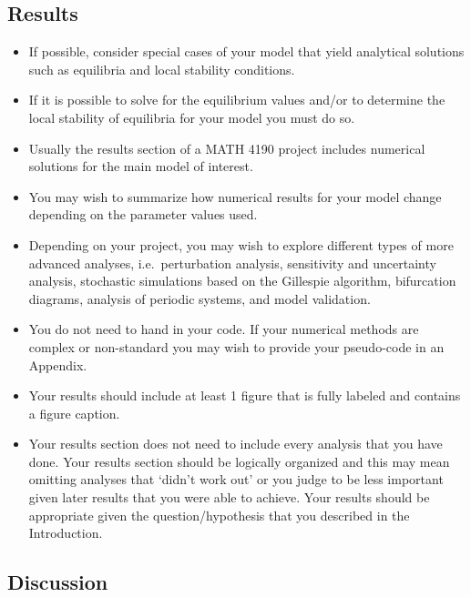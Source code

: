 \documentclass[]{book}
\providecommand{\tightlist}{%
  \setlength{\itemsep}{0pt}\setlength{\parskip}{0pt}}
\begin{document}
\subsection{Results}\label{results}

\begin{itemize}
\tightlist
\item
  If possible, consider special cases of your model that yield
  analytical solutions such as equilibria and local stability
  conditions.
\item
  If it is possible to solve for the equilibrium values and/or to
  determine the local stability of equilibria for your model you must do
  so.
\item
  Usually the results section of a MATH 4190 project includes numerical
  solutions for the main model of interest.
\item
  You may wish to summarize how numerical results for your model change
  depending on the parameter values used.
\item
  Depending on your project, you may wish to explore different types of
  more advanced analyses, i.e.~perturbation analysis, sensitivity and
  uncertainty analysis, stochastic simulations based on the Gillespie
  algorithm, bifurcation diagrams, analysis of periodic systems, and
  model validation.
\item
  You do not need to hand in your code. If your numerical methods are
  complex or non-standard you may wish to provide your pseudo-code in an
  Appendix.
\item
  Your results should include at least 1 figure that is fully labeled
  and contains a figure caption.
\item
  Your results section does not need to include every analysis that you
  have done. Your results section should be logically organized and this
  may mean omitting analyses that `didn't work out' or you judge to be
  less important given later results that you were able to achieve. Your
  results should be appropriate given the question/hypothesis that you
  described in the Introduction.
\end{itemize}

\subsection{Discussion}\label{discussion}
\end{document}
